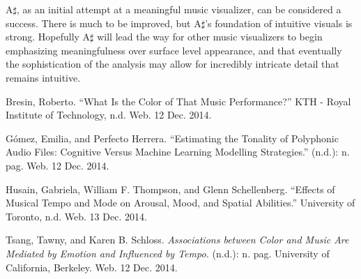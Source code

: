 \documentclass{article}
\begin{document}
A$\sharp$, as an initial attempt at a meaningful music visualizer, can be considered a success. There is much to be improved, but A$\sharp$'s foundation of intuitive visuals is strong. Hopefully A$\sharp$ will lead the way for other music visualizers to begin emphasizing meaningfulness over surface level appearance, and that eventually the sophistication of the analysis may allow for incredibly intricate detail that remains intuitive.

\begin{thebibliography}{9}

    Bresin, Roberto.
    ``What Is the Color of That Music Performance?''
    KTH - Royal Institute of Technology, n.d. Web. 12 Dec. 2014.

    G\'{o}mez, Emilia, and Perfecto Herrera.
    ``Estimating the Tonality of Polyphonic Audio Files: Cognitive Versus Machine Learning Modelling Strategies.''
    (n.d.): n. pag. Web. 12 Dec. 2014.

    Husain, Gabriela, William F. Thompson, and Glenn Schellenberg.
    ``Effects of Musical Tempo and Mode on Arousal, Mood, and Spatial Abilities.''
    University of Toronto, n.d. Web. 13 Dec. 2014.

    Tsang, Tawny, and Karen B. Schloss.
    \emph{Associations between Color and Music Are Mediated by Emotion and Influenced by Tempo.}
    (n.d.): n. pag.
    University of California, Berkeley. Web. 12 Dec. 2014.

\end{thebibliography}
\end{document}
